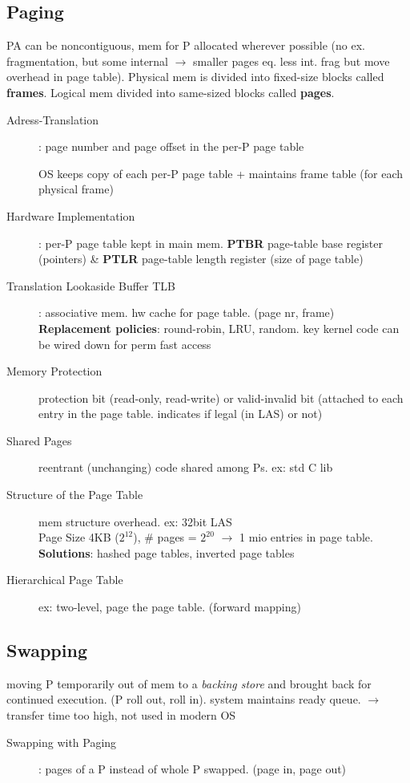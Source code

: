 \subsection*{Paging}
PA can be noncontiguous, mem for P allocated wherever possible (no ex. fragmentation, but some internal $\rightarrow$ smaller pages eq. less int. frag but move overhead in page table). Physical mem is divided into fixed-size blocks called \textbf{frames}. Logical mem divided into same-sized blocks called \textbf{pages}.\\
\begin{description}
    \item[Adress-Translation]: page number and page offset in the per-P page table
    \item[] OS keeps copy of each per-P page table + maintains frame table (for each physical frame)
    \item[Hardware Implementation]: per-P page table kept in main mem. \textbf{PTBR} page-table base register (pointers) \& \textbf{PTLR} page-table length register (size of page table)
    \item[Translation Lookaside Buffer TLB]: associative mem. hw cache for page table. (page nr, frame) \textbf{Replacement policies}: round-robin, LRU, random. key kernel code can be wired down for perm fast access
    \item[Memory Protection] protection bit (read-only, read-write) or valid-invalid bit (attached to each entry in the page table. indicates if legal (in LAS) or not)
    \item[Shared Pages]reentrant (unchanging) code shared among Ps. ex: std C lib
\item[Structure of the Page Table] mem structure overhead. ex: 32bit LAS \\
    Page Size 4KB ($2^{12}$), \# pages = $2^{20}$ $\rightarrow$ 1 mio entries in page table. \\
    \textbf{Solutions}: hashed page tables, inverted page tables
    \item[Hierarchical Page Table]ex: two-level, page the page table. (forward mapping) \\ %
\end{description}
\vspace{5\baselineskip}
\subsection*{Swapping}
moving P temporarily out of mem to a \textit{backing store} and brought back for continued execution. (P roll out, roll in). system maintains ready queue. $\rightarrow$ transfer time too high, not used in modern OS
\begin{description}
    \item[Swapping with Paging]: pages of a P instead of whole P swapped. (page in, page out)
\end{description}
